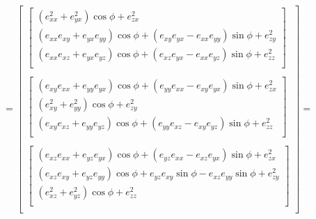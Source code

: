 \[
    =
    \begin{bmatrix}
        \begin{bmatrix}
            (e_{xx}^2 + e_{yx}^2) \cos \phi + e_{zx}^2 \\
            (e_{xx} e_{xy} + e_{yx} e_{yy}) \cos \phi + (e_{xy} e_{yx} - e_{xx} e_{yy}) \sin \phi + e_{zy}^2 \\
            (e_{xx} e_{xz} + e_{yx} e_{yz}) \cos \phi + (e_{xz} e_{yx} - e_{xx} e_{yz}) \sin \phi + e_{zz}^2 \\
        \end{bmatrix} \\ \\
        \begin{bmatrix}
            (e_{xy} e_{xx} + e_{yy} e_{yx}) \cos \phi + (e_{yy} e_{xx} - e_{xy} e_{yx}) \sin \phi + e_{zx}^2 \\
            (e_{xy}^2 + e_{yy}^2) \cos \phi + e_{zy}^2 \\
            (e_{xy} e_{xz} + e_{yy} e_{yz}) \cos \phi + (e_{yy} e_{xz} - e_{xy} e_{yz}) \sin \phi + e_{zz}^2 \\
        \end{bmatrix} \\ \\
        \begin{bmatrix}
            (e_{xz} e_{xx} + e_{yz} e_{yx}) \cos \phi + (e_{yz} e_{xx} - e_{xz} e_{yx}) \sin \phi + e_{zx}^2 \\
            (e_{xz} e_{xy} + e_{yz} e_{yy}) \cos \phi + e_{yz} e_{xy} \sin \phi - e_{xz} e_{yy} \sin \phi + e_{zy}^2 \\
            (e_{xz}^2 + e_{yz}^2) \cos \phi + e_{zz}^2 \\
        \end{bmatrix} \\
    \end{bmatrix} =
\]
